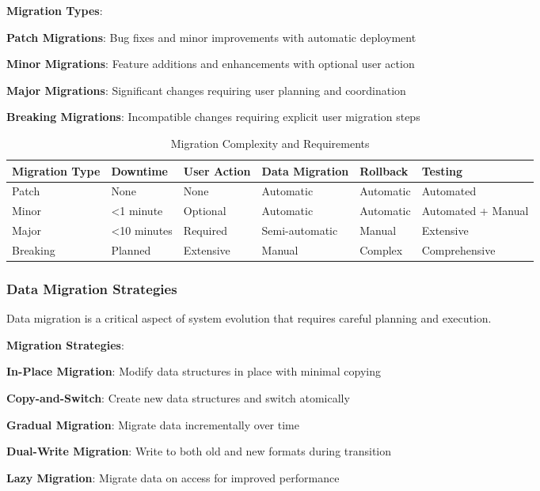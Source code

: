 \textbf{Migration Types}:
\begin{compactlist}
    \item \textbf{Patch Migrations}: Bug fixes and minor improvements with automatic deployment
    \item \textbf{Minor Migrations}: Feature additions and enhancements with optional user action
    \item \textbf{Major Migrations}: Significant changes requiring user planning and coordination
    \item \textbf{Breaking Migrations}: Incompatible changes requiring explicit user migration steps
\end{compactlist}

\begin{table}[h]
\centering
\caption{Migration Complexity and Requirements}
\label{tab:migration-types}
\begin{tabular}{@{}llllll@{}}
\toprule
\textbf{Migration Type} & \textbf{Downtime} & \textbf{User Action} & \textbf{Data Migration} & \textbf{Rollback} & \textbf{Testing} \\
\midrule
Patch & None & None & Automatic & Automatic & Automated \\
Minor & <1 minute & Optional & Automatic & Automatic & Automated + Manual \\
Major & <10 minutes & Required & Semi-automatic & Manual & Extensive \\
Breaking & Planned & Extensive & Manual & Complex & Comprehensive \\
\bottomrule
\end{tabular}
\end{table}

\subsubsection*{Data Migration Strategies}

Data migration is a critical aspect of system evolution that requires careful planning and execution.

\textbf{Migration Strategies}:
\begin{expandedlist}
    \item \textbf{In-Place Migration}: Modify data structures in place with minimal copying
    \item \textbf{Copy-and-Switch}: Create new data structures and switch atomically
    \item \textbf{Gradual Migration}: Migrate data incrementally over time
    \item \textbf{Dual-Write Migration}: Write to both old and new formats during transition
    \item \textbf{Lazy Migration}: Migrate data on access for improved performance
\end{expandedlist}

